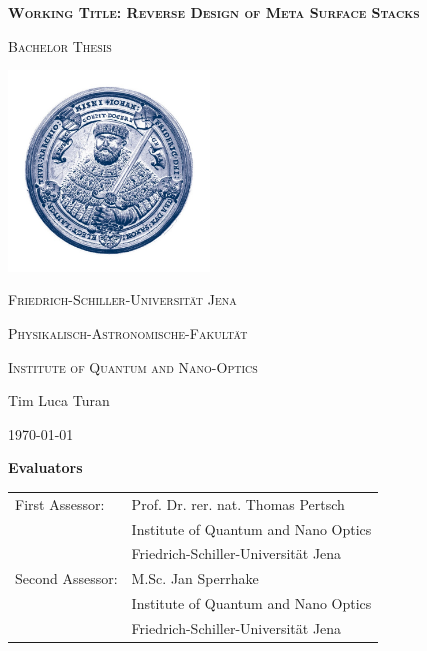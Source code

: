 \documentclass[a4paper,headsepline,11pt]{scrartcl}
\begin{document}
\begin{titlepage}
	\centering

	{\scshape\Large \textbf{Working Title: Reverse Design of Meta Surface Stacks} \par}
	\vspace{1cm}
	{\scshape\Large Bachelor Thesis \par}
	\vspace{1.5cm}
	\includegraphics[width=0.4\textwidth]{uni_jena_bildmarke_700x700}\par
	{\huge\bfseries \par}
	\vspace{10cm}
	{\scshape\large Friedrich-Schiller-Universität Jena\par}
	{\scshape\large Physikalisch-Astronomische-Fakultät\par}
	{\scshape\large Institute of Quantum and Nano-Optics\par}
	\vfill
	{\Large Tim Luca Turan}

	\vfill

	{\large \today\par}
\end{titlepage}
\thispagestyle{empty}
\vspace*{\fill}
\textbf{\Large Evaluators}\\[1.5cm]

\begin{tabular}{ll}
First Assessor: & Prof. Dr. rer. nat. Thomas Pertsch\\
 & Institute of Quantum and Nano Optics \\
 & Friedrich-Schiller-Universität Jena \\
Second Assessor: & M.Sc. Jan Sperrhake \\
 & Institute of Quantum and Nano Optics \\
 & Friedrich-Schiller-Universität Jena \\
\end{tabular}
\end{document}
